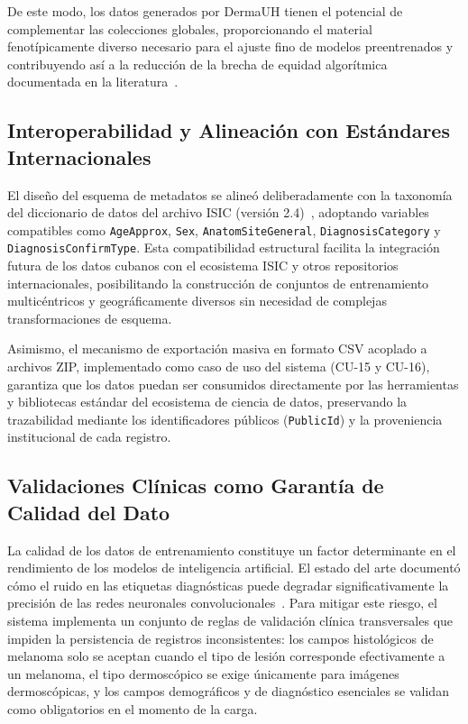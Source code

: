 De este modo, los datos generados por DermaUH tienen el potencial de complementar las colecciones globales, proporcionando el material fenotípicamente diverso necesario para el ajuste fino de modelos preentrenados y contribuyendo así a la reducción de la brecha de equidad algorítmica documentada en la literatura~\cite{melba_calibration,iccs_bias_derm}.

\subsection{Interoperabilidad y Alineación con Estándares Internacionales}

El diseño del esquema de metadatos se alineó deliberadamente con la taxonomía del diccionario de datos del archivo ISIC (versión 2.4)~\cite{isic_home}, adoptando variables compatibles como \texttt{AgeApprox}, \texttt{Sex}, \texttt{AnatomSiteGeneral}, \texttt{DiagnosisCategory} y \texttt{DiagnosisConfirmType}. Esta compatibilidad estructural facilita la integración futura de los datos cubanos con el ecosistema ISIC y otros repositorios internacionales, posibilitando la construcción de conjuntos de entrenamiento multicéntricos y geográficamente diversos sin necesidad de complejas transformaciones de esquema.

Asimismo, el mecanismo de exportación masiva en formato CSV acoplado a archivos ZIP, implementado como caso de uso del sistema (CU-15 y CU-16), garantiza que los datos puedan ser consumidos directamente por las herramientas y bibliotecas estándar del ecosistema de ciencia de datos, preservando la trazabilidad mediante los identificadores públicos (\texttt{PublicId}) y la proveniencia institucional de cada registro.

\subsection{Validaciones Clínicas como Garantía de Calidad del Dato}

La calidad de los datos de entrenamiento constituye un factor determinante en el rendimiento de los modelos de inteligencia artificial. El estado del arte documentó cómo el ruido en las etiquetas diagnósticas puede degradar significativamente la precisión de las redes neuronales convolucionales~\cite{pmc_label_noise}. Para mitigar este riesgo, el sistema implementa un conjunto de reglas de validación clínica transversales que impiden la persistencia de registros inconsistentes: los campos histológicos de melanoma solo se aceptan cuando el tipo de lesión corresponde efectivamente a un melanoma, el tipo dermoscópico se exige únicamente para imágenes dermoscópicas, y los campos demográficos y de diagnóstico esenciales se validan como obligatorios en el momento de la carga.

